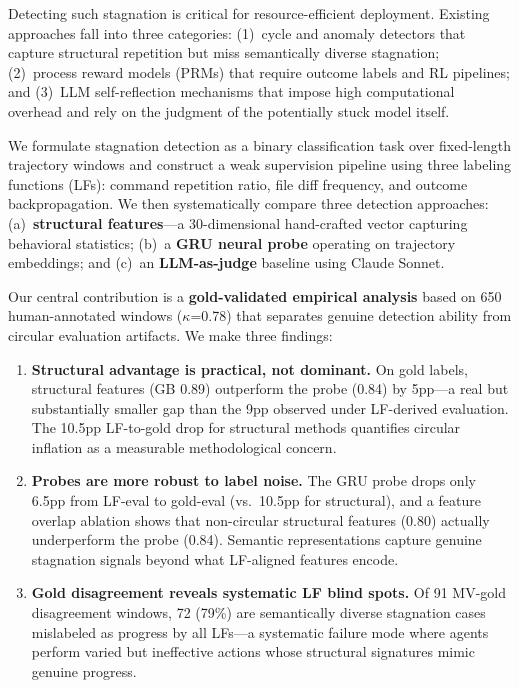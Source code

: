 \documentclass[11pt,a4paper]{article}
\begin{document}
Detecting such stagnation is critical for resource-efficient deployment.
Existing approaches fall into three categories: (1)~cycle and anomaly detectors that capture structural repetition but miss semantically diverse stagnation; (2)~process reward models (PRMs) that require outcome labels and RL pipelines; and (3)~LLM self-reflection mechanisms that impose high computational overhead and rely on the judgment of the potentially stuck model itself.

We formulate stagnation detection as a binary classification task over fixed-length trajectory windows and construct a weak supervision pipeline using three labeling functions (LFs): command repetition ratio, file diff frequency, and outcome backpropagation.
We then systematically compare three detection approaches: (a)~\textbf{structural features}---a 30-dimensional hand-crafted vector capturing behavioral statistics; (b)~a \textbf{GRU neural probe} operating on trajectory embeddings; and (c)~an \textbf{LLM-as-judge} baseline using Claude Sonnet.

Our central contribution is a \textbf{gold-validated empirical analysis} based on 650 human-annotated windows ($\kappa$=0.78) that separates genuine detection ability from circular evaluation artifacts.
We make three findings:

\begin{enumerate}[leftmargin=*,nosep]
\item \textbf{Structural advantage is practical, not dominant.} On gold labels, structural features (GB 0.89) outperform the probe (0.84) by 5pp---a real but substantially smaller gap than the 9pp observed under LF-derived evaluation. The 10.5pp LF-to-gold drop for structural methods quantifies circular inflation as a measurable methodological concern.

\item \textbf{Probes are more robust to label noise.} The GRU probe drops only 6.5pp from LF-eval to gold-eval (vs.\ 10.5pp for structural), and a feature overlap ablation shows that non-circular structural features (0.80) actually underperform the probe (0.84). Semantic representations capture genuine stagnation signals beyond what LF-aligned features encode.

\item \textbf{Gold disagreement reveals systematic LF blind spots.} Of 91 MV-gold disagreement windows, 72 (79\%) are semantically diverse stagnation cases mislabeled as progress by all LFs---a systematic failure mode where agents perform varied but ineffective actions whose structural signatures mimic genuine progress.
\end{enumerate}
\end{document}
